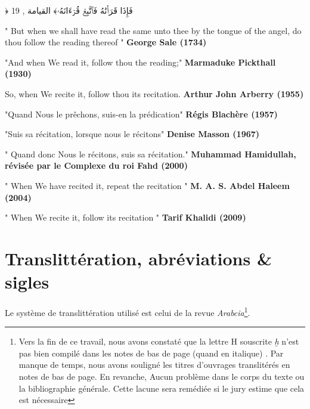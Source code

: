 \documentclass[a4paper,12pt]{report}
\begin{document}
\newpage

\thispagestyle{empty}
\begin{Arabic}
 \centering \Large ﴿ فَإِذَا قَرَأۡنَٰهُ فَٱتَّبِعۡ قُرۡءَانَهُۥ﴾
 القيامة , 19

\end{Arabic}




    
     " But when we shall have read the same unto thee by the tongue of the angel, do thou follow the reading thereof " \textbf{ George Sale (1734)}
    

   "And when We read it, follow thou the reading;" \textbf{Marmaduke Pickthall (1930)}

 
      So, when We recite it, follow thou its recitation. 
      \textbf{Arthur John Arberry (1955)}

      
  "Quand Nous le prêchons, suis-en la prédication" \textbf{Régis Blachère (1957)}

 
  "Suis sa récitation, lorsque nous le récitons" \textbf{Denise Masson (1967)}
 
   
 
 " Quand donc Nous le récitons, suis sa récitation." \textbf{Muhammad Hamidullah, révisée par le Complexe du roi Fahd (2000)}
    

" When We have recited it, repeat the
recitation " \textbf{M. A. S. Abdel Haleem (2004)}


 
" When We recite it, follow its recitation "\textbf{ Tarif Khalidi  (2009)}


\newpage
{}
\setcounter{page}{3}
\chapter*{ Translittération, abréviations \& sigles  }
\thispagestyle{empty}


Le système de translittération utilisé est celui de la revue \textit{Arabcia}\footnote{ Vers la fin de ce travail, nous avons constaté que la lettre H souscrite\textit{ ḫ} n'est pas bien compilé dans les notes de bas de page (quand en italique) . Par manque de temps, nous avons souligné les titres  d'ouvrages  translitérés  en notes de bas de page. En revanche, Aucun problème dans le corps du texte ou la bibliographie générale. Cette lacune sera remédiée si le jury estime que cela est nécessaire }. 
\end{document}

